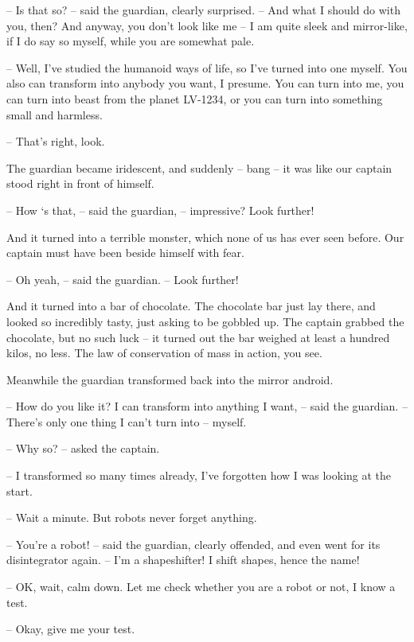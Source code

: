 \documentclass[ebook,twoside,final,openright]{memoir}
\begin{document}
– Is that so? – said the guardian, clearly surprised. – And what I should do with you, then? And anyway, you don’t look like me – I am quite sleek and mirror-like, if I do say so myself, while you are somewhat pale.\par
– Well, I've studied the humanoid ways of life, so I’ve turned into one myself. You also can transform into anybody you want, I presume. You can turn into me, you can turn into beast from the planet LV-1234, or you can turn into something small and harmless.\par
– That's right, look.\par
\par
The guardian became iridescent, and suddenly – bang – it was like our captain stood right in front of himself.\par
– How ‘s that, – said the guardian, – impressive? Look further!\par
And it turned into a terrible monster, which none of us has ever seen before. Our captain must have been beside himself with fear.\par
– Oh yeah, – said the guardian. – Look further!\par
\par
And it turned into a bar of chocolate. The chocolate bar just lay there, and looked so incredibly tasty, just asking to be gobbled up. The captain grabbed the chocolate, but no such luck – it turned out the bar weighed at least a hundred kilos, no less. The law of conservation of mass in action, you see.\par
\par
Meanwhile the guardian transformed back into the mirror android.\par
– How do you like it? I can transform into anything I want, – said the guardian. – There’s only one thing I can’t turn into – myself.\par
– Why so? – asked the captain.\par
– I transformed so many times already, I’ve forgotten how I was looking at the start.\par
– Wait a minute. But robots never forget anything.\par
– You’re a robot! – said the guardian, clearly offended, and even went for its disintegrator again. – I’m a shapeshifter! I shift shapes, hence the name!\par
– OK, wait, calm down. Let me check whether you are a robot or not, I know a test.\par
– Okay, give me your test.\par
\end{document}

